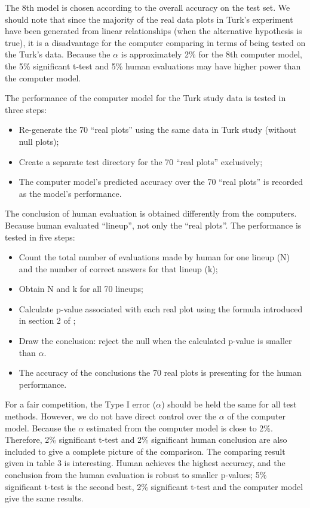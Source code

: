 \documentclass[12pt]{article}
\begin{document}
The 8th model is chosen according to the overall accuracy on the test
set. We should note that since the majority of the real data plots in
Turk's experiment have been generated from linear relationships (when
the alternative hypothesis is true), it is a disadvantage for the
computer comparing in terms of being tested on the Turk's data. Because
the \(\alpha\) is approximately 2\% for the 8th computer model, the 5\%
significant t-test and 5\% human evaluations may have higher power than
the computer model.

The performance of the computer model for the Turk study data is tested
in three steps:

\begin{itemize}
\item
  Re-generate the 70 ``real plots'' using the same data in Turk study
  (without null plots);
\item
  Create a separate test directory for the 70 ``real plots''
  exclusively;
\item
  The computer model's predicted accuracy over the 70 ``real plots'' is
  recorded as the model's performance.
\end{itemize}

The conclusion of human evaluation is obtained differently from the
computers. Because human evaluated ``lineup'', not only the ``real
plots''. The performance is tested in five steps:

\begin{itemize}
\item
  Count the total number of evaluations made by human for one lineup (N)
  and the number of correct answers for that lineup (k);
\item
  Obtain N and k for all 70 lineups;
\item
  Calculate p-value associated with each real plot using the formula
  introduced in section 2 of \citet{MM13};
\item
  Draw the conclusion: reject the null when the calculated p-value is
  smaller than \(\alpha\).
\item
  The accuracy of the conclusions the 70 real plots is presenting for
  the human performance.
\end{itemize}

For a fair competition, the Type I error (\(\alpha\)) should be held the
same for all test methods. However, we do not have direct control over
the \(\alpha\) of the computer model. Because the \(\alpha\) estimated
from the computer model is close to 2\%. Therefore, 2\% significant
t-test and 2\% significant human conclusion are also included to give a
complete picture of the comparison. The comparing result given in table
3 is interesting. Human achieves the highest accuracy, and the
conclusion from the human evaluation is robust to smaller p-values; 5\%
significant t-test is the second best, 2\% significant t-test and the
computer model give the same results.
\end{document}
